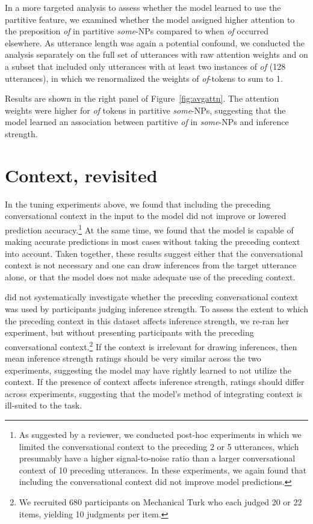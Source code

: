 \documentclass[11pt,a4paper]{article}
\newcommand{\figref}[1]{Figure~\ref{#1}}
\begin{document}
In a more targeted analysis to assess whether the model learned to use the partitive feature, we examined whether the model assigned higher attention to the preposition \emph{of} in partitive \emph{some}-NPs compared to when \emph{of} occurred elsewhere. 
As utterance length was again a potential confound, we conducted the analysis separately on the full set of utterances with raw attention weights and on a subset that included only utterances with at least two instances of \emph{of} (128 utterances), in which we renormalized the weights of \emph{of}-tokens to sum to 1.

Results are shown in the right panel of \figref{fig:avgattn}. The attention weights were higher for \emph{of} tokens in partitive \emph{some}-NPs, suggesting that the model learned an association between partitive \emph{of} in \emph{some}-NPs and inference strength. 


\section{Context, revisited}
\label{sec:context}

In the tuning experiments above, we found that including the preceding conversational context in the input to the model did not improve or  lowered prediction accuracy.\footnote{As suggested by a reviewer, we conducted post-hoc experiments in which we limited the conversational context to the preceding 2 or 5 utterances, which presumably have a higher signal-to-noise ratio than a larger conversational context of 10 preceding utterances. In these experiments, we again found that including the conversational context did not improve model predictions.} At the same time, we found that the model is capable of making accurate predictions in most cases without taking the preceding context into account. Taken together, these results suggest either that the conversational context is not necessary and one can draw inferences from the target utterance alone, or that the model does not make adequate use of the preceding context. 

\citet{degen2015investigating} did not systematically investigate whether the preceding conversational context was used by participants judging inference strength. To assess the extent to which the preceding context in this dataset affects inference strength, we re-ran her experiment, but without presenting participants with the preceding conversational context.\footnote{We recruited 680 participants on Mechanical Turk who each judged 20 or 22 items, yielding 10 judgments per item.} If the context is irrelevant for drawing inferences, then mean inference strength ratings should be very similar across the two experiments, suggesting the model may have rightly learned to not utilize the context. If the presence of context affects inference strength,  ratings should differ across experiments, suggesting that the model's method of integrating context is ill-suited to the task.
\end{document}
